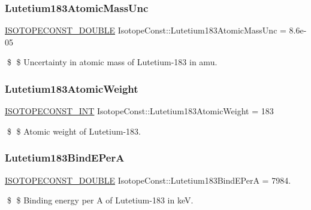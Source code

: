 \subsubsection{\texorpdfstring{Lutetium183\+Atomic\+Mass\+Unc}{Lutetium183AtomicMassUnc}}
{\footnotesize\ttfamily \mbox{\hyperlink{group___isotope_const-_macros_ga8f45a7272ce02c0b4c65c44636ed719a}{I\+S\+O\+T\+O\+P\+E\+C\+O\+N\+S\+T\+\_\+\+D\+O\+U\+B\+LE}} Isotope\+Const\+::\+Lutetium183\+Atomic\+Mass\+Unc = 8.\+6e-\/05}

\$ \$ Uncertainty in atomic mass of Lutetium-\/183 in amu. \mbox{\label{group___isotope_const-_lutetium-_lu183_ga57d8bef2f2c64a6a4825371045719356}} 
\subsubsection{\texorpdfstring{Lutetium183\+Atomic\+Weight}{Lutetium183AtomicWeight}}
{\footnotesize\ttfamily \mbox{\hyperlink{group___isotope_const-_macros_ga5f18360b3e99483a35c32d789e62621c}{I\+S\+O\+T\+O\+P\+E\+C\+O\+N\+S\+T\+\_\+\+I\+NT}} Isotope\+Const\+::\+Lutetium183\+Atomic\+Weight = 183}

\$ \$ Atomic weight of Lutetium-\/183. \mbox{\label{group___isotope_const-_lutetium-_lu183_ga12452b010b70fe6b3e92e04e7c75226d}} 
\subsubsection{\texorpdfstring{Lutetium183\+Bind\+E\+PerA}{Lutetium183BindEPerA}}
{\footnotesize\ttfamily \mbox{\hyperlink{group___isotope_const-_macros_ga8f45a7272ce02c0b4c65c44636ed719a}{I\+S\+O\+T\+O\+P\+E\+C\+O\+N\+S\+T\+\_\+\+D\+O\+U\+B\+LE}} Isotope\+Const\+::\+Lutetium183\+Bind\+E\+PerA = 7984.}

\$ \$ Binding energy per A of Lutetium-\/183 in keV. \mbox{\label{group___isotope_const-_lutetium-_lu183_ga633083f464e05794418d796a3f363f68}} 
